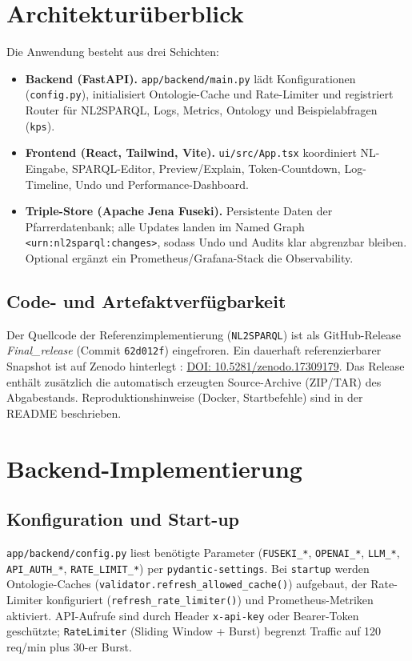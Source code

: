 \section{Architekturüberblick}
Die Anwendung besteht aus drei Schichten:
\begin{itemize}
  \item \textbf{Backend (FastAPI).} \texttt{app/backend/main.py} lädt Konfigurationen (\texttt{config.py}), initialisiert Ontologie-Cache und Rate-Limiter und registriert Router für NL2SPARQL, Logs, Metrics, Ontology und Beispielabfragen (\texttt{kps}).
  \item \textbf{Frontend (React, Tailwind, Vite).} \texttt{ui/src/App.tsx} koordiniert NL-Eingabe, SPARQL-Editor, Preview/Explain, Token-Countdown, Log-Timeline, Undo und Performance-Dashboard.
  \item \textbf{Triple-Store (Apache Jena Fuseki).} Persistente Daten der Pfarrerdatenbank; alle Updates landen im Named Graph \texttt{<urn:nl2sparql:changes>}, sodass Undo und Audits klar abgrenzbar bleiben. Optional ergänzt ein Prometheus/Grafana-Stack die Observability.
\end{itemize}

\subsection{Code- und Artefaktverfügbarkeit}
Der Quellcode der Referenzimplementierung (\texttt{NL2SPARQL}) ist als GitHub-Release
\emph{Final\_release} (Commit \texttt{62d012f}) eingefroren. Ein dauerhaft referenzierbarer
Snapshot ist auf Zenodo hinterlegt \cite{kleinert_nl2sparql_zenodo}:
\href{https://doi.org/10.5281/zenodo.17309179}{DOI: 10.5281/zenodo.17309179}.
Das Release enthält zusätzlich die automatisch erzeugten Source-Archive (ZIP/TAR) des
Abgabestands. Reproduktionshinweise (Docker, Startbefehle) sind in der README beschrieben.


\section{Backend-Implementierung}

\subsection{Konfiguration und Start-up}
\texttt{app/backend/config.py} liest benötigte Parameter (\texttt{FUSEKI\_*}, \texttt{OPENAI\_*}, \texttt{LLM\_*}, \texttt{API\_AUTH\_*}, \texttt{RATE\_LIMIT\_*}) per \texttt{pydantic-settings}. Bei \texttt{startup} werden Ontologie-Caches (\texttt{validator.refresh\_allowed\_cache()}) aufgebaut, der Rate-Limiter konfiguriert (\texttt{refresh\_rate\_limiter()}) und Prometheus-Metriken aktiviert. API-Aufrufe sind durch Header \texttt{x-api-key} oder Bearer-Token geschützte; \texttt{RateLimiter} (Sliding Window + Burst) begrenzt Traffic auf 120 req/min plus 30-er Burst.

